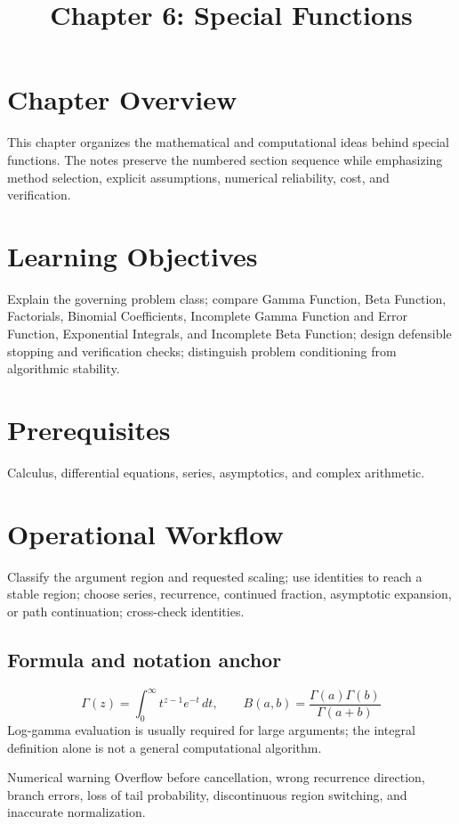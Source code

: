 \documentclass[10pt,letterpaper]{article}
\title{Chapter 6: Special Functions}
\author{}
\date{}
\begin{document}
\maketitle

\section*{Chapter Overview}
This chapter organizes the mathematical and computational ideas behind special functions. The notes preserve the numbered section sequence while emphasizing method selection, explicit assumptions, numerical reliability, cost, and verification.

\section*{Learning Objectives}
Explain the governing problem class; compare Gamma Function, Beta Function, Factorials, Binomial Coefficients, Incomplete Gamma Function and Error Function, Exponential Integrals, and Incomplete Beta Function; design defensible stopping and verification checks; distinguish problem conditioning from algorithmic stability.

\section*{Prerequisites}
Calculus, differential equations, series, asymptotics, and complex arithmetic.

\section*{Operational Workflow}
Classify the argument region and requested scaling; use identities to reach a stable region; choose series, recurrence, continued fraction, asymptotic expansion, or path continuation; cross-check identities.

\subsection*{Formula and notation anchor}
\[
\Gamma(z)=\int_0^\infty t^{z-1}e^{-t}\,dt,\qquad B(a,b)=\frac{\Gamma(a)\Gamma(b)}{\Gamma(a+b)}
\]
Log-gamma evaluation is usually required for large arguments; the integral definition alone is not a general computational algorithm.

\begin{warnbox}{Numerical warning}
Overflow before cancellation, wrong recurrence direction, branch errors, loss of tail probability, discontinuous region switching, and inaccurate normalization.
\end{warnbox}
\end{document}
